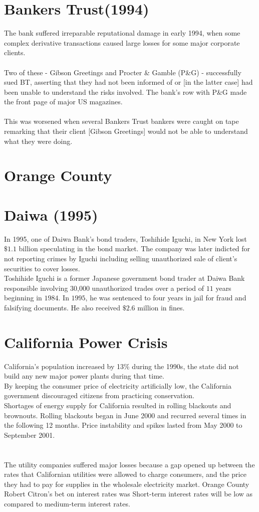 \documentclass[12pt, a4paper]{report}
\begin{document}
\section{Bankers Trust(1994)}
The bank suffered irreparable reputational damage in early 1994,
when some complex derivative transactions caused large losses for
some major corporate clients. \\\\Two of these - Gibson Greetings
and Procter \& Gamble (P\&G) - successfully sued BT, asserting
that they had not been informed of or [in the latter case] had
been unable to understand the risks involved. The bank's row with
P\&G made the front page of major US magazines. \\\\This was
worsened when several Bankers Trust bankers were caught on tape
remarking that their client [Gibson Greetings] would not be able
to understand what they were doing.



\section{Orange County}
\section{Daiwa (1995)}
In 1995, one of Daiwa Bank's bond traders, Toshihide Iguchi, in
New York lost $\$1.1$ billion speculating in the bond market. The
company was later indicted for not reporting crimes by Iguchi
including selling unauthorized sale of client's securities to
cover losses.
\\
Toshihide Iguchi is a former Japanese government bond trader at
Daiwa Bank responsible involving 30,000 unauthorized trades over a
period of $11$ years beginning in $1984$. In $1995$, he was
sentenced to four years in jail for fraud and falsifying
documents. He also received $\$2.6$ million in fines.

\section{California Power Crisis}
California's population increased by 13\% during the 1990s, the
state did not build any new major power plants during that
time.\\By keeping the consumer price of electricity artificially
low, the California government discouraged citizens from
practicing conservation.\\Shortages of energy supply for
California resulted in rolling blackouts and brownouts. Rolling
blackouts began in June 2000 and recurred several times in the
following 12 months. Price instability and spikes lasted from May
2000 to September 2001.
\\
\\
\\
The utility companies suffered major losses because a gap opened
up between the rates that Californian utilities were allowed to
charge consumers, and the price they had to pay for supplies in
the wholesale electricity market. Orange County Robert Citron's
bet on interest rates was Short-term interest rates will be low as
compared to medium-term interest rates.
\end{document}
